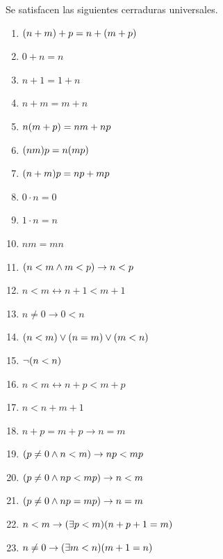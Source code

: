 \begin{theorem}
	Se satisfacen las siguientes cerraduras universales.

	\begin{enumerate}
		\item $\pa*{n + m} + p = n +\pa*{m + p}$
		\item $0 + n = n$
		\item $n + 1 = 1 + n$
		\item $n + m = m + n$
		\item $n\pa*{m + p} = nm + np$
		\item $\pa*{nm}p = n\pa*{mp}$
		\item $\pa*{n + m}p = np + mp$
		\item $0\cdot n = 0$
		\item $1\cdot n = n$
		\item $nm = mn$
		\item $\pa*{n < m\land m < p}\to n < p$
		\item $n < m\leftrightarrow n + 1 < m + 1$
		\item $n\neq 0\to 0 < n$
		\item $\pa*{n < m}\lor\pa*{n = m}\lor\pa*{m < n}$
		\item $\neg\pa*{n < n}$
		\item $ n < m\leftrightarrow n + p < m + p$
		\item $n < n + m + 1$
		\item $n + p = m + p\to n = m$
		\item $\pa*{p\neq 0\land n < m}\to np < mp$
		\item $\pa*{p\neq 0\land np < mp}\to n < m$
		\item $\pa*{p\neq 0\land np = mp}\to n = m$
		\item $n < m\to\pa*{\exists p < m}\pa*{n + p + 1 = m}$
		\item $n\neq 0\to\pa*{\exists m < n}\pa*{m + 1 = n}$
	\end{enumerate}
\end{theorem}

